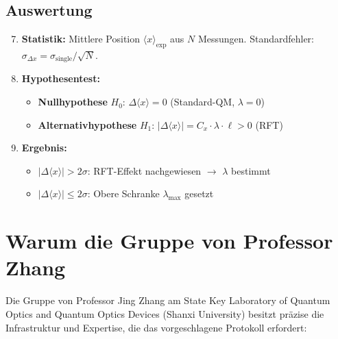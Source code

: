 \documentclass[a4paper,11pt]{article}
\begin{document}
\subsection{Auswertung}

\begin{enumerate}
  \setcounter{enumi}{6}
  \item \textbf{Statistik:} Mittlere Position $\langle x\rangle_{\mathrm{exp}}$
    aus $N$ Messungen.
    Standardfehler: $\sigma_{\Delta x} = \sigma_{\mathrm{single}}/\sqrt{N}$.
  \item \textbf{Hypothesentest:}
    \begin{itemize}
      \item \textbf{Nullhypothese} $H_0$: $\Delta\langle x\rangle = 0$
        (Standard-QM, $\lambda = 0$)
      \item \textbf{Alternativhypothese} $H_1$:
        $|\Delta\langle x\rangle| = C_x \cdot \lambda \cdot \ell > 0$ (RFT)
    \end{itemize}
  \item \textbf{Ergebnis:}
    \begin{itemize}
      \item $|\Delta\langle x\rangle| > 2\sigma$: RFT-Effekt nachgewiesen
        $\to$ $\lambda$ bestimmt
      \item $|\Delta\langle x\rangle| \leq 2\sigma$: Obere Schranke
        $\lambda_{\max}$ gesetzt
    \end{itemize}
\end{enumerate}

\section{Warum die Gruppe von Professor Zhang}

Die Gruppe von Professor Jing Zhang am State Key Laboratory of Quantum
Optics and Quantum Optics Devices (Shanxi University) besitzt präzise die
Infrastruktur und Expertise, die das vorgeschlagene Protokoll erfordert:
\end{document}
